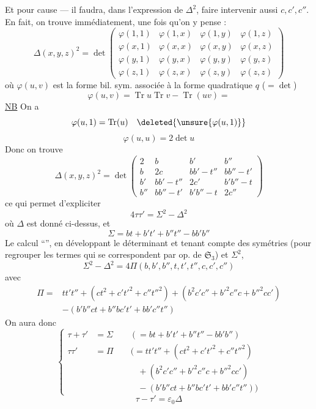 Et pour cause --- il faudra, dans l'expression de $\Delta^2$, faire intervenir aussi $c,c',c''$. En fait, on trouve immédiatement, une fois qu'on y pense :
\[
\Delta(x,y,z)^2=\det\begin{pmatrix}
\varphi(1,1)&\varphi(1,x)&\varphi(1,y)&\varphi(1,z)\\
\varphi(x,1)&\varphi(x,x)&\varphi(x,y)&\varphi(x,z)\\
\varphi(y,1)&\varphi(y,x)&\varphi(y,y)&\varphi(y,z)\\
\varphi(z,1)&\varphi(z,x)&\varphi(z,y)&\varphi(z,z)
\end{pmatrix}
\]
où $\varphi(u,v)$ est la forme bil. sym. associée à la forme quadratique $q$ ($=\det$)
\[
\varphi(u,v)=\operatorname{Tr}u\operatorname{Tr}v-\operatorname{Tr}(uv)=
\]
\uline{NB} On a
\[
\varphi(u,1)=\operatorname{Tr}(u)\quad\deleted{\unsure{\varphi(u,1)}}
\]
\[
\varphi(u,u)=2\det u
\]
Donc on trouve
\[
\boxed{\Delta(x,y,z)^2=\det\begin{pmatrix}
2&b&b'&b''\\
b&2c&bb'-t''&bb''-t'\\
b'&bb'-t''&2c'&b'b''-t\\
b''&bb''-t'&b'b''-t&2c''
\end{pmatrix}}
\]
ce qui permet d'expliciter
\[
4\tau\tau'=\Sigma^2-\Delta^2
\]
où $\Delta$ est donné ci-dessus, et
\[
\boxed{\Sigma=bt+b't'+b''t''-bb'b''}
\]
Le calcul ``'', en développant le déterminant et tenant compte des symétries (pour regrouper les termes qui se correspondent par  op. de $\mathfrak{S}_3$) et $\Sigma^2$,
\[
\Sigma^2-\Delta^2=4\Pi(b,b',b'',t,t',t'',c,c',c'')
\]
avec
\[
\boxed{\begin{aligned}
\Pi={}&tt't''+(ct^2+c't'^2+c''t''^2)+(b^2c'c''+b'^2c''c+b''^2cc')\\
&-(b'b''ct+b''bc't'+bb'c''t'')
\end{aligned}}
\]
\inserted{\[
=tt't''+ct(t-b'b'')+c't'(t'-b''b)+c''t''(t''-bb')+(b^2c'c''+b'^2c''c+b''^2cc')
\]}
On aura donc
\[
\left\{\begin{aligned}
\tau+\tau'&=\Sigma\qquad(=bt+b't'+b''t''-bb'b'')\\
\tau\tau'&=\Pi\qquad\bigl(=tt't''+(ct^2+c't'^2+c''t''^2)\\
&\qquad\qquad\quad+(b^2c'c''+b'^2c''c+b''^2cc')\\
&\qquad\qquad\quad-(b'b''ct+b''bc't'+bb'c''t'')\bigr)
\end{aligned}\right.
\]
\[
\tau-\tau'=\varepsilon_0\Delta
\]
